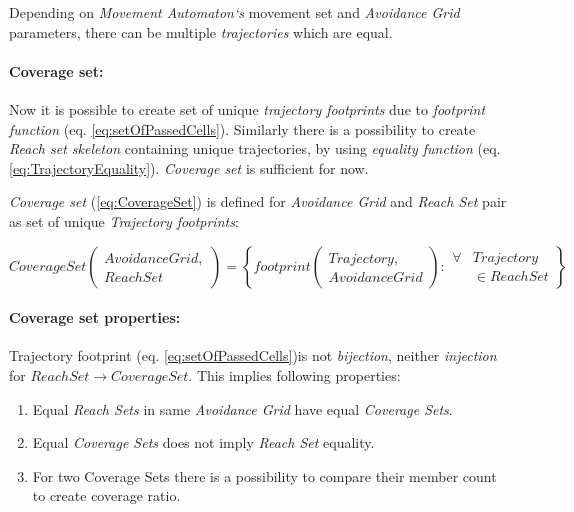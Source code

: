 \begin{note}
    Depending on \emph{Movement Automaton`s} movement set and \emph{Avoidance Grid} parameters, there can be multiple \emph{trajectories} which are equal.
\end{note}

\paragraph{Coverage set:} Now it is possible to create set of unique \emph{trajectory footprints} due to \emph{footprint function} (eq. \ref{eq:setOfPassedCells}). Similarly there is a possibility to create \emph{Reach set skeleton} containing unique trajectories, by using 
\emph{equality function} (eq. \ref{eq:TrajectoryEquality}).
\emph{Coverage set} is sufficient for now.

\begin{definition}\label{def:CoverageSet}
    \emph{Coverage set} (\ref{eq:CoverageSet}) is defined for \emph{Avoidance Grid} and \emph{Reach Set} pair as set of unique \emph{Trajectory footprints}:
    
    \begin{equation}\label{eq:CoverageSet}
        CoverageSet\left(\begin{gathered}AvoidanceGrid,\\ReachSet\end{gathered}\right)= \left\{
            footprint\left(\begin{gathered}     
                Trajectory,\\AvoidanceGrid
            \end{gathered}\right):
            \begin{aligned}
                \forall &Trajectory\\ &\in Reach Set
            \end{aligned}\right\}
    \end{equation}
\end{definition}

\paragraph{Coverage set properties:} Trajectory footprint (eq. \ref{eq:setOfPassedCells})is not \emph{bijection}, neither \emph{injection} for $ReachSet \to CoverageSet$. This implies following properties:

\begin{enumerate}
    \item Equal \emph{Reach Sets} in same \emph{Avoidance Grid} have equal \emph{Coverage Sets}.
    
    \item Equal \emph{Coverage Sets} does not imply \emph{Reach Set} equality.
    
    \item For two {Coverage Sets} there is a possibility to compare their member count to create coverage ratio.
\end{enumerate}

